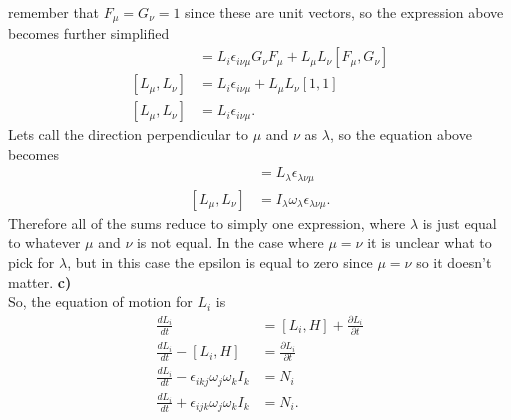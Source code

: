 \documentclass[10pt]{article}
\begin{document}
remember that $F_{\mu}=G_{\nu}=1$ since these are unit vectors, so the expression above becomes
further simplified
\begin{align*}
  [F_{\mu}L_{\mu},G_{\nu}L_{\nu}] &= L_i\epsilon_{i\nu\mu}G_{\nu}F_{\mu}+L_{\mu}L_{\nu}[F_{\mu},G_{\nu}]\\
  [L_{\mu},L_{\nu}] &= L_i\epsilon_{i\nu\mu}+L_{\mu}L_{\nu}[1,1]\\
  [L_{\mu},L_{\nu}] &= L_i\epsilon_{i\nu\mu}.
\end{align*}
Lets call the direction perpendicular to $\mu$ and $\nu$ as $\lambda$, so the equation above
becomes
\begin{align*}
  [L_{\mu},L_{\nu}] &= L_{\lambda}\epsilon_{\lambda\nu\mu}\\
  [L_{\mu},L_{\nu}] &= I_{\lambda}\omega_{\lambda}\epsilon_{\lambda\nu\mu}.
\end{align*}
Therefore all of the sums reduce to simply one expression, where $\lambda$ is just equal to whatever $\mu$ and $\nu$ is not equal.  In the case where $\mu=\nu$ it is unclear what to pick for $\lambda$, but in this case the epsilon is equal to zero since $\mu=\nu$ so it doesn't matter. 
\textbf{c)}\\
So, the equation of motion for $L_i$ is
\begin{align*}
  \frac{dL_i}{dt} &= [L_i,H] + \frac{\partial L_i}{\partial t}\\
  \frac{dL_i}{dt} - [L_i,H] &= \frac{\partial L_i}{\partial t}\\
  \frac{dL_i}{dt} - \epsilon_{ikj}\omega_j\omega_kI_k &= N_i\\
  \frac{dL_i}{dt} + \epsilon_{ijk}\omega_j\omega_kI_k &= N_i.
\end{align*}
\end{document}
